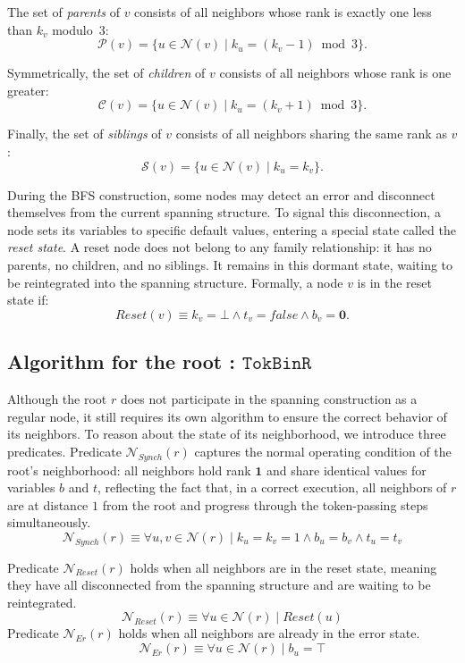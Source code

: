 \documentclass[a4paper, 12pt]{article}
\newcommand{\Neig}{\mathcal{N}}
\newcommand{\Pa}{\mathcal{P}}
\newcommand{\bz}{\mathbf{0}}
\newcommand{\bo}{\mathbf{1}}
\newcommand{\rk}{k}
\begin{document}
The set of \emph{parents} of $v$ consists of all neighbors whose rank is exactly one less than $\rk_v$ modulo~$3$:
$$\Pa(v)=\{u\in \Neig(v)\mid \rk_u=(\rk_v-1)\bmod 3\}.$$

Symmetrically, the set of \emph{children} of $v$ consists of all neighbors whose rank is one greater:
$$\mathcal{C}(v)= \{u\in \Neig(v)\mid \rk_u=(\rk_v+1)\bmod 3\}.$$

Finally, the set of \emph{siblings} of $v$ consists of all neighbors sharing the same rank as $v$:
$$\mathcal{S}(v)= \{u\in \Neig(v)\mid \rk_u=\rk_v\}.$$

During the BFS construction, some nodes may detect an error and disconnect themselves from the current spanning structure. To signal this disconnection, a node sets its variables to specific default values, entering a special state called the \emph{reset state}. A reset node does not belong to any family relationship: it has no parents, no children, and no siblings. It remains in this dormant state, waiting to be reintegrated into the spanning structure. Formally, a node $v$ is in the reset state if:
$$Reset(v)\equiv \rk_v=\bot \wedge t_v=\mathit{false} \wedge b_v=\bz.$$



\subsection{Algorithm for the root : $\mathtt{TokBinR}$}
\label{subsec:TokBinR}
Although the root $r$ does not participate in the spanning construction as a regular node, it still requires its own algorithm to ensure the correct behavior of its neighbors. To reason about the state of its neighborhood, we introduce three predicates. Predicate $\mathcal{N}_{Synch}(r)$ captures the normal operating condition of the root's neighborhood: all neighbors hold rank $\bo$ and share identical values for variables $b$ and $t$, reflecting the fact that, in a correct execution, all neighbors of $r$ are at distance $1$ from the root and progress through the token-passing steps simultaneously.
\begin{equation}
    \mathcal{N}_{Synch}(r)\equiv  \forall u,v\in \Neig(r)\mid \rk_u=\rk_v=1\wedge b_u=b_v\wedge t_u=t_v
\end{equation}

Predicate $\mathcal{N}_{Reset}(r)$ holds when all neighbors are in the reset state, meaning they have all disconnected from the spanning structure and are waiting to be reintegrated. 
\begin{equation}
    \mathcal{N}_{Reset}(r)\equiv \forall u\in \Neig(r)\mid Reset(u)
\end{equation}
Predicate $\mathcal{N}_{Er}(r)$ holds when all neighbors are already in the error state.
\begin{equation}
    \mathcal{N}_{Er}(r)\equiv \forall u\in \Neig(r)\mid b_u=\top
\end{equation}
\end{document}
